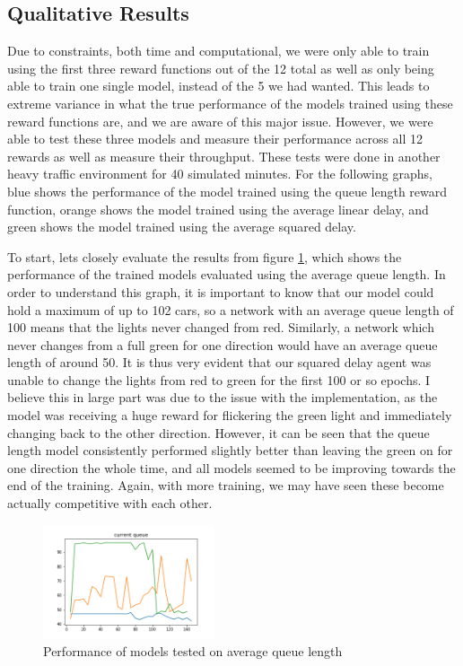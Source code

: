 \documentclass[12pt,twocolumn]{article}
\begin{document}
\subsection{Qualitative Results}

Due to constraints, both time and computational, we were only able to train using the first three reward functions out of the 12 total as well as only being able to train one single model, instead of the 5 we had wanted. This leads to extreme variance in what the true performance of the models trained using these reward functions are, and we are aware of this major issue. However, we were able to test these three models and measure their performance across all 12 rewards as well as measure their throughput. These tests were done in another heavy traffic environment for 40 simulated minutes. For the following graphs, blue shows the performance of the model trained using the queue length reward function, orange shows the model trained using the average linear delay, and green shows the model trained using the average squared delay.

To start, lets closely evaluate the results from figure \ref{fig:current_queue}, which shows the performance of the trained models evaluated using the average queue length. In order to understand this graph, it is important to know that our model could hold a maximum of up to 102 cars, so a network with an average queue length of 100 means that the lights never changed from red. Similarly, a network which never changes from a full green for one direction would have an average queue length of around 50. It is thus very evident that our squared delay agent was unable to change the lights from red to green for the first 100 or so epochs. I believe this in large part was due to the issue with the implementation, as the model was receiving a huge reward for flickering the green light and immediately changing back to the other direction. However, it can be seen that the queue length model consistently performed slightly better than leaving the green on for one direction the whole time, and all models seemed to be improving towards the end of the training. Again, with more training, we may have seen these become actually competitive with each other. 

\begin{figure}
    \begin{center}
    \includegraphics[width=0.45\textwidth]{Figures/current_queue}
    \caption{Performance of models tested on average queue length}
    \label{fig:current_queue}
    \end{center}
\end{figure}
\end{document}
